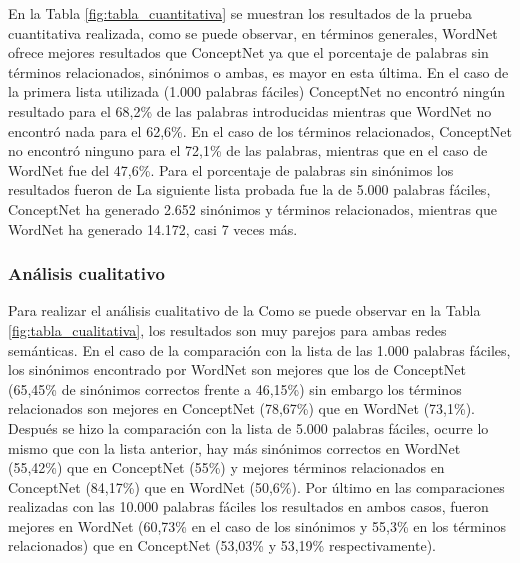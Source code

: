 En la Tabla \ref{fig:tabla_cuantitativa} se muestran los resultados de la prueba cuantitativa realizada, como se puede observar, en términos generales, WordNet ofrece mejores resultados que ConceptNet ya que el porcentaje de palabras sin términos relacionados, sinónimos o ambas, es mayor en esta última. En el caso de la primera lista utilizada (1.000 palabras fáciles) ConceptNet no encontró ningún resultado para el 68,2\% de las palabras introducidas mientras que WordNet no encontró nada para el 62,6\%. En el caso de los términos relacionados, ConceptNet no encontró ninguno para el 72,1\% de las palabras, mientras que en el caso de WordNet fue del 47,6\%. Para el porcentaje de palabras sin sinónimos los resultados fueron de  La siguiente lista probada fue la de 5.000 palabras fáciles, ConceptNet ha generado 2.652 sinónimos y términos relacionados, mientras que WordNet ha generado 14.172, casi 7 veces más.



\subsubsection{Análisis cualitativo}
\label{sssec:pruebaCualitativa}
Para realizar el análisis cualitativo de la
Como se puede observar en la Tabla \ref{fig:tabla_cualitativa}, los resultados son muy parejos para ambas redes semánticas. En el caso de la comparación con la lista de las 1.000 palabras fáciles, los sinónimos encontrado por WordNet son mejores que los de ConceptNet (65,45\% de sinónimos correctos frente a 46,15\%) sin embargo los términos relacionados son mejores en ConceptNet (78,67\%) que en WordNet (73,1\%). Después se hizo la comparación con la lista de 5.000 palabras fáciles, ocurre lo mismo que con la lista anterior, hay más sinónimos correctos en WordNet (55,42\%) que en ConceptNet (55\%) y mejores términos relacionados en ConceptNet (84,17\%) que en WordNet (50,6\%). Por último en las comparaciones realizadas con las 10.000 palabras fáciles los resultados en ambos casos, fueron mejores en WordNet (60,73\% en el caso de los sinónimos y 55,3\% en los términos relacionados) que en ConceptNet (53,03\% y 53,19\% respectivamente).


